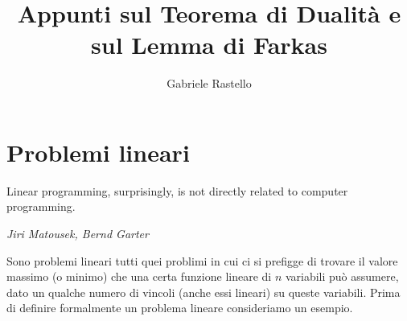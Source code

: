 \documentclass[italian, letter paper, 12pt, reqno]{article}
\theoremstyle{myteo}
\numberwithin{equation}{section}
\begin{document}
\title{Appunti sul Teorema di Dualità e sul Lemma di Farkas}
\author{Gabriele Rastello}
\maketitle
\tableofcontents

\section{Problemi lineari}
\label{sec:problemi_lineari}
\epigraph{Linear programming, surprisingly, is not directly related to computer programming.}{\textit{Jiri Matousek, Bernd Garter}}
Sono problemi lineari tutti quei problimi in cui ci si prefigge di trovare il valore massimo (o minimo) che una certa funzione lineare di \(n\) variabili può assumere, dato un qualche numero di vincoli (anche essi lineari) su queste variabili.
Prima di definire formalmente un problema lineare consideriamo un esempio.
\end{document}

